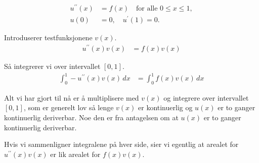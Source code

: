 \documentclass[../main.tex]{subfiles}
\begin{document}
\begin{align*}
    u^{\prime\prime}(x) & = f(x) \quad \text{for alle } 0 \leq x \leq 1, \\
    u(0)                & = 0,\quad u^{\prime}(1) = 0.
\end{align*}

Introduserer testfunksjonene $v(x)$.
\begin{align*}
    u^{\prime\prime}(x) v(x) & = f(x) v(x)
\end{align*}

Så integrerer vi over intervallet $[0,1]$.
\begin{align*}
    \int_0^1 -u^{\prime\prime}(x) v(x) \, dx & = \int_0^1 f(x) v(x) \, dx
\end{align*}

Alt vi har gjort til nå er å multiplisere med $v(x)$ og integrere over intervallet $[0,1]$, som er generelt lov så lenge $v(x)$ er kontinuerlig og $u(x)$ er to ganger kontinuerlig deriverbar.
Noe den er fra antagelsen om at $u(x)$ er to ganger kontinuerlig deriverbar.

Hvis vi sammenligner integralene på hver side, sier vi egentlig at arealet for $u^{\prime\prime}(x) v(x)$ er lik arealet for $f(x) v(x)$.
\end{document}
